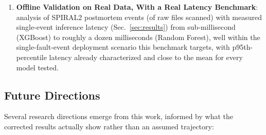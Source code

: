 \begin{enumerate}
    \item \textbf{Offline Validation on Real Data, With a Real Latency Benchmark}: analysis of \MetricZeroSixBinaryClassificationNEventsTotal{} SPIRAL2 postmortem events (of \MetricZeroZeroDataAttritionChainRawFiles{} raw files scanned) with measured single-event inference latency (Sec.~\ref{sec:results}) from sub-millisecond (XGBoost) to roughly a dozen milliseconds (Random Forest), well within the single-fault-event deployment scenario this benchmark targets, with p95th-percentile latency already characterized and close to the mean for every model tested.
\end{enumerate}

\subsection{Future Directions}

Several research directions emerge from this work, informed by what the corrected results actually show rather than an assumed trajectory:

